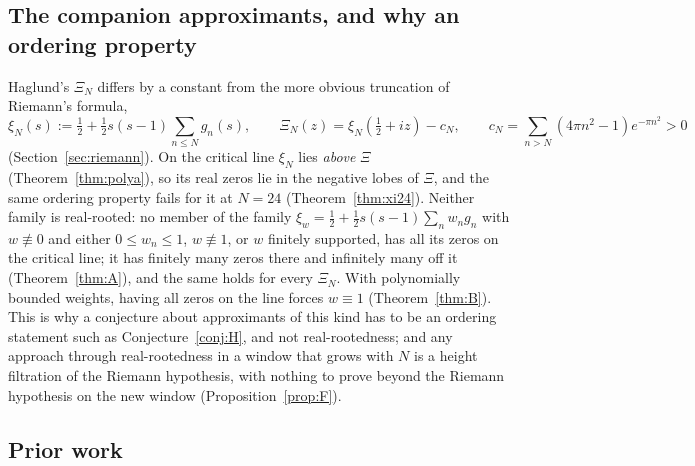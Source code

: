 \documentclass[11pt]{article}
\theoremstyle{plain}
\theoremstyle{definition}
\theoremstyle{remark}
\begin{document}
\subsection{The companion approximants, and why an ordering property}

Haglund's $\Xi_N$ differs by a constant from the more obvious truncation of
Riemann's formula,
\[
\xi_N(s) := \tfrac12 + \tfrac12 s(s-1)\sum_{n \le N} g_n(s), \qquad
\Xi_N(z) = \xi_N(\tfrac12 + iz) - c_N, \qquad
c_N = \sum_{n > N}(4\pi n^2 - 1)e^{-\pi n^2} > 0
\]
(Section~\ref{sec:riemann}). On the critical line $\xi_N$ lies \emph{above} $\Xi$
(Theorem~\ref{thm:polya}), so its real zeros lie in the negative lobes of $\Xi$,
and the same ordering property fails for it at $N = 24$
(Theorem~\ref{thm:xi24}). Neither family is real-rooted: no member of the
family
$\xi_w = \tfrac12 + \tfrac12 s(s-1)\sum_n w_n g_n$ with $w \not\equiv 0$ and either
$0 \le w_n \le 1$, $w \not\equiv 1$, or $w$ finitely supported, has all its zeros on the
critical line; it has finitely many zeros there and infinitely many off it
(Theorem~\ref{thm:A}), and the same holds for every $\Xi_N$. With polynomially bounded weights, having all zeros on
the line forces $w \equiv 1$ (Theorem~\ref{thm:B}). This is why a conjecture
about approximants of this kind has to be an ordering statement such as
Conjecture~\ref{conj:H}, and not real-rootedness; and any approach through
real-rootedness in a window that grows with $N$ is a height filtration of the
Riemann hypothesis, with nothing to prove beyond the Riemann hypothesis on the
new window (Proposition~\ref{prop:F}).

\subsection{Prior work}
\end{document}
